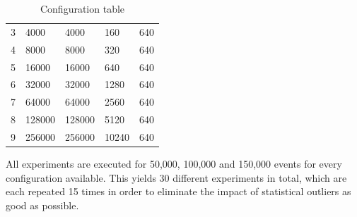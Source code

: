 \begin{table}
\begin{tabular}{lllll}
3                                           & 4000                                                       & 4000                                                  & 160                                                       & 640                                                                \\
4                                           & 8000                                                       & 8000                                                  & 320                                                       & 640                                                                \\
5                                           & 16000                                                      & 16000                                                 & 640                                                       & 640                                                               \\
6                                           & 32000                                                      & 32000                                                 & 1280                                                      & 640                                                               \\
7                                           & 64000                                                      & 64000                                                 & 2560                                                      & 640                                                               \\
8                                           & 128000                                                     & 128000                                                & 5120                                                      & 640                                                              \\
9                                           & 256000                                                     & 256000                                                & 10240                                                     & 640                                                             
\end{tabular}
\label{table:evaluation:performance:bridge:configs}
\caption{Configuration table}
\end{table}

All experiments are executed for 50,000, 100,000 and 150,000 events for every configuration available.
This yields 30 different experiments in total, which are each repeated 15 times in order to eliminate the impact of statistical outliers as good as possible.

